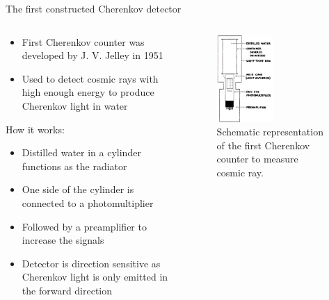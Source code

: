 \documentclass[aspectratio=1610, 10pt]{beamer}
\begin{document}
\begin{frame}{The first constructed Cherenkov detector}
  \begin{columns}
  \begin{column}{0.5\textwidth}
  \begin{itemize}
    \item First Cherenkov counter was developed by J. V. Jelley in 1951
    \medskip
    \item Used to detect cosmic rays with high enough energy to produce Cherenkov light in water
    \medskip \\
  \end{itemize}
\vspace{0.5cm}
How it works:
  \begin{itemize}
    \item Distilled water in a cylinder functions as the radiator

    \item One side of the cylinder is connected to a photomultiplier
    \medskip
    \item Followed by a preamplifier to increase the signals
    \medskip
    \item Detector is direction sensitive as Cherenkov light is only emitted in the forward direction
  \end{itemize}
  \end{column}
  \begin{column}{0.5\textwidth}
    \begin{figure}
      \includegraphics[width=0.5\textwidth]{images/the_first.png}
      \caption{Schematic representation of the first Cherenkov counter to measure cosmic ray. \cite{gaseous}}
    \end{figure}
  \end{column}
  \end{columns}
\end{frame}
\end{document}
